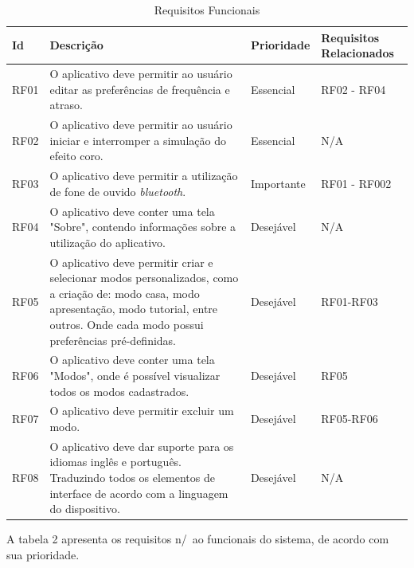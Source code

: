 \begin{table}[H]
	\caption{Requisitos Funcionais}\label{tab:reqfuncionais}
	\centering
	\begin{tabular}{|p{1.0cm}|p{8.0cm}|p{2.0cm}|p{2.5cm}|}
		\hline
		\textbf{Id} & \textbf{Descri\c{c}\~ao} & \textbf{Prioridade} & \textbf{Requisitos Relacionados}\\
	
		\hline
		RF01 & O aplicativo deve permitir ao usu\'ario editar as prefer\^encias de frequ\^encia e atraso. & Essencial & RF02 - RF04\\
		
		\hline
		RF02 & O aplicativo deve permitir ao usu\'ario iniciar e interromper a simula\c{c}\~ao do efeito coro. & Essencial & N/A \\
		
		\hline
		RF03 & O aplicativo deve permitir a utiliza\c{c}\~ao de fone de ouvido \textit{bluetooth}. & Importante & RF01 - RF002\\
		
		\hline
		RF04 & O aplicativo deve conter uma tela "Sobre", contendo informa\c{c}\~oes sobre a utiliza\c{c}\~ao do aplicativo. & Desej\'avel & 
		N/A\\
		
		\hline
		RF05 & O aplicativo deve permitir criar e selecionar modos personalizados, como a cria\c{c}\~ao de: modo casa, modo apresenta\c{c}\~ao, modo tutorial, entre outros. Onde cada modo possui prefer\^encias pr\'e-definidas. & Desej\'avel & RF01-RF03\\
		
		\hline
		RF06 & O aplicativo deve conter uma tela "Modos", onde \'e poss\'ivel visualizar todos os modos cadastrados. & Desej\'avel & RF05\\
		
		\hline
		RF07 & O aplicativo deve permitir excluir um modo. & Desej\'avel & RF05-RF06\\
		
		\hline
		RF08 & O aplicativo deve dar suporte para os idiomas ingl\^es e portugu\^es. Traduzindo todos os elementos de interface de acordo com a linguagem do dispositivo. & Desej\'avel & N/A\\
		
		\hline	
	
	\end{tabular}
\end{table}

A tabela 2 apresenta os requisitos n/~ao funcionais do sistema, de acordo com sua prioridade. 

